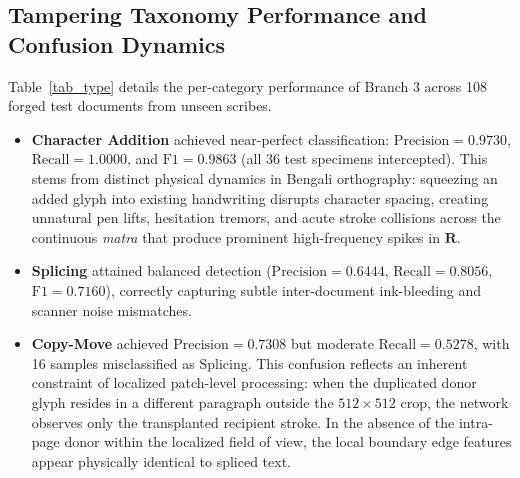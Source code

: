 \documentclass[runningheads]{llncs}
\begin{document}
\begin{table}[t]
\caption{Controlled component ablation on the held-out writer-independent test split (144 document patches from 9 unseen writers).}\label{tab_ablation}
\centering
\setlength{\tabcolsep}{4pt}
\end{table}

\subsection{Tampering Taxonomy Performance and Confusion Dynamics}\label{subsec5_4}
Table~\ref{tab_type} details the per-category performance of Branch 3 across 108 forged test documents from unseen scribes.
\begin{itemize}
    \item \textbf{Character Addition} achieved near-perfect classification: $\text{Precision} = 0.9730$, $\text{Recall} = 1.0000$, and $\text{F1} = 0.9863$ (all 36 test specimens intercepted). This stems from distinct physical dynamics in Bengali orthography: squeezing an added glyph into existing handwriting disrupts character spacing, creating unnatural pen lifts, hesitation tremors, and acute stroke collisions across the continuous \textit{matra} that produce prominent high-frequency spikes in $\mathbf{R}$.
    \item \textbf{Splicing} attained balanced detection ($\text{Precision} = 0.6444$, $\text{Recall} = 0.8056$, $\text{F1} = 0.7160$), correctly capturing subtle inter-document ink-bleeding and scanner noise mismatches.
    \item \textbf{Copy-Move} achieved $\text{Precision} = 0.7308$ but moderate $\text{Recall} = 0.5278$, with 16 samples misclassified as Splicing. This confusion reflects an inherent constraint of localized patch-level processing: when the duplicated donor glyph resides in a different paragraph outside the $512 \times 512$ crop, the network observes only the transplanted recipient stroke. In the absence of the intra-page donor within the localized field of view, the local boundary edge features appear physically identical to spliced text.
\end{itemize}
\end{document}
